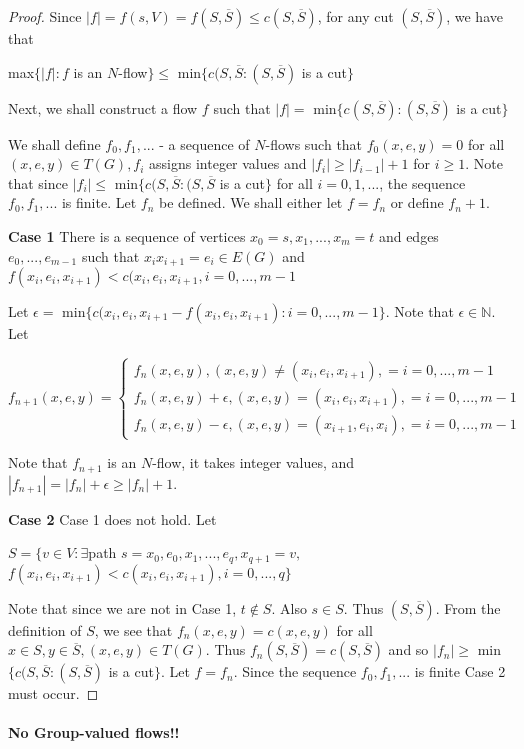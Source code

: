 \begin{proof}
   Since $|f| = f(s,V) = f(S,\overline{S}) \leq c(S,\overline{S})$, for any 
   cut $(S,\overline{S})$, we have that 
       \begin{center}
        max$\{|f|: f$ is an $N$-flow$\} \leq$ min$\{c(S,\overline{S}: 
        (S,\overline{S})$ is a cut$\}$
       \end{center}
   Next, we shall construct a flow $f$ such that $|f| =$ 
   min$\{c(S,\overline{S}): (S,\overline{S})$ is a cut$\}$
   
   We shall define $f_0,f_1,...$ - a sequence of $N$-flows such that 
   $f_0(x,e,y) = 0$ for all $(x,e,y) \in T(G), f_i$ assigns integer values 
   and $|f_i| \geq |f_{i-1}| + 1$ for $i \geq 1$. Note that since 
   $|f_i| \leq$ min$\{c(S,\overline{S}: (S,\overline{S}$ is a cut$\}$ for 
   all $i = 0,1,...$, the sequence $f_0,f_1,...$ is finite.
   Let $f_n$ be defined. We shall either let $f = f_n$ or define $f_n+1$.

   \bigskip \noindent
   \textbf{Case 1} There is a sequence of vertices $x_0 = s,x_1,...,x_m = t$
   and edges $e_0,...,e_{m-1}$ such that $x_ix_{i+1} = e_i \in E(G)$ and 
   $f(x_i,e_i,x_{i+1}) < c(x_i,e_i,x_{i+1}, i = 0,...,m-1$
   
   \smallskip \noindent
   Let $\epsilon = \text{ min}\{c(x_i,e_i,x_{i+1} - f(x_i,e_i,x_{i+1}):
   i = 0,...,m-1\}$. Note that $\epsilon \in \mathbb{N}$. Let 
   \begin{center}$f_{n+1}(x,e,y) = 
       \begin{cases}
            f_n(x,e,y), (x,e,y) \neq (x_i,e_i,x_{i+1}), = i = 0,...,m-1 \\
            f_n(x,e,y)+\epsilon, (x,e,y) = (x_i,e_i,x_{i+1}), = i = 0,...,m-1 \\
            f_n(x,e,y)-\epsilon, (x,e,y) = (x_{i+1},e_i,x_i), = i = 0,...,m-1 
       \end{cases}$
   \end{center}
   Note that $f_{n+1}$ is an $N$-flow, it takes integer values, and 
   $|f_{n+1}| = |f_n| + \epsilon \geq |f_n| + 1$.

   \bigskip \noindent
   \textbf{Case 2} Case 1 does not hold. Let 
   \begin{center}
        $S = \{v \in V: \exists$path $s=x_0,e_0,x_1,...,e_q,x_{q+1} = v,$ \\     
        $ f(x_i,e_i,x_{i+1}) < c(x_i,e_i,x_{i+1}), i = 0,...,q\}$
   \end{center}
   Note that since we are not in Case 1, $t \notin S$. Also $s \in S$. Thus
   $(S,\overline{S})$. From the definition of $S$, we see that 
   $f_n(x,e,y) = c(x,e,y)$ for all $x \in S, y \in \overline{S}, (x,e,y) 
   \in T(G)$. Thus $f_n(S,\overline{S}) = c(S,\overline{S})$ and so 
   $|f_n| \geq$ min$\{c(S,\overline{S}: (S,\overline{S})$ is a cut$\}$. Let
   $f = f_n$. Since the sequence $f_0,f_1,...$ is finite Case 2 must occur.
\end{proof}

\paragraph{No Group-valued flows!!}
